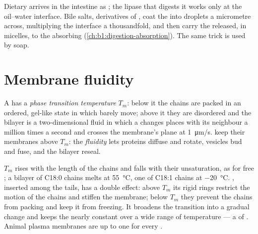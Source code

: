 \begin{example}\label{ex:b1:lipids:bile}
Dietary  arrives in the intestine as ; the lipase that digests it
works only at the oil--water interface. Bile salts, 
derivatives of , coat the  into droplets a micrometre
across, multiplying the interface a thousandfold, and then carry the
 released, in micelles, to the absorbing 
(\cref{ch:b1:digestion-absorption}). The same trick is used by soap.
\end{example}

\section{Membrane fluidity}

\begin{definition}\label{def:b1:lipids:fluidity}
A  has a \emph{phase transition temperature} $T_m$: below it the chains are packed in an
ordered, gel-like state in which  barely move; above it they are
disordered and the bilayer is a two-dimensional fluid in which a 
changes places with its neighbour a million times a second and crosses
the membrane's plane at \qty{1}{\micro m/s}.  keep their membranes
above $T_m$: the \emph{fluidity} lets proteins
diffuse and rotate, vesicles bud and fuse, and the bilayer reseal.
\end{definition}

\begin{proposition}\label{prop:b1:lipids:fluidityfactors}
$T_m$ rises with the length of the chains and falls with their
unsaturation, as for free ; a bilayer of C18:0 chains melts
at \qty{55}{\celsius}, one of C18:1 chains at \qty{-20}{\celsius}.
, inserted among the tails, has a double effect: above
$T_m$ its rigid rings restrict the motion of the chains and stiffen
the membrane; below $T_m$ they prevent the chains from packing and keep
it from freezing. It broadens the transition into a gradual change and
keeps the  nearly constant over a wide range of temperature ---
a  of . Animal plasma membranes are up to one 
for every .
\end{proposition}

